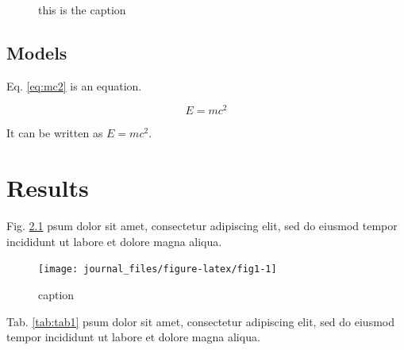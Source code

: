 \documentclass[fontsize=11pt, %
                             paper=a4, %
                             twoside, %
                             captions=tableheading,
                             index=totoc,
                             hyperref]{labbook}
\theoremstyle{definition}
\theoremstyle{definition}
\theoremstyle{remark}
\begin{document}
\begin{addmargin}[4cm]{0cm}
\begin{figure}
{}

\caption{this is the caption}\label{fig:img1}
\end{figure}

\section{Models}\label{models}

Eq. \eqref{eq:mc2} is an equation.

\begin{equation} 
E = mc^2
  \label{eq:mc2}
\end{equation}

It can be written as \(E = mc^2\).

\chapter{Results}\label{results}

Fig. \ref{fig:fig1} psum dolor sit amet, consectetur adipiscing elit,
sed do eiusmod tempor incididunt ut labore et dolore magna aliqua.

\begin{figure}

{\centering \texttt{[image: journal\_files/figure-latex/fig1-1]} 

}

\caption{caption}\label{fig:fig1}
\end{figure}

Tab. \ref{tab:tab1} psum dolor sit amet, consectetur adipiscing elit,
sed do eiusmod tempor incididunt ut labore et dolore magna aliqua.

\begin{table}


\end{table}
\end{addmargin}
\end{document}
